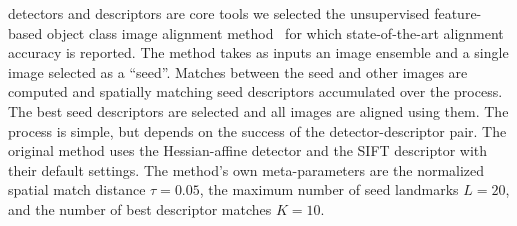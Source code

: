\documentclass[10pt,journal,cspaper,compsoc]{IEEEtran}
\begin{document}
detectors and descriptors are core tools we selected
the unsupervised feature-based object class image alignment
method~\cite{LanKam:2011} for which state-of-the-art alignment
accuracy is reported. The method takes as inputs an
image ensemble and a single image selected as a ``seed''.
Matches between the seed and other
images are computed and spatially matching seed descriptors accumulated
over the process. The best seed descriptors are selected and all
images are aligned using them.
The process is simple, but depends on the success of the
detector-descriptor pair.
The original method uses the Hessian-affine detector and the
SIFT descriptor with their default settings. The
method's own meta-parameters are the normalized spatial match
distance $\tau=0.05$, the maximum number of seed landmarks $L=20$,
and the number of best descriptor matches $K=10$.
\end{document}
